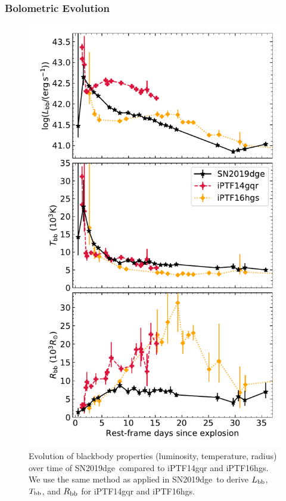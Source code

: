 \documentclass[twocolumn]{aastex63}
\newcommand{\name}{SN2019dge}
\begin{document}
\begin{CJK*}{UTF8}{gbsn}
\subsubsection{Bolometric Evolution} \label{subsubsec:bolometric_evolution}
\begin{figure}[!htbp] 
	\centering
	\includegraphics[width=\columnwidth]{figures/Tbb_Rbb_log.pdf}
	\caption{Evolution of blackbody properties (luminosity, temperature, radius) over time of 
		\name\ compared to iPTF14gqr and iPTF16hgs. We use the same method as applied in \name\ to 
		derive $L_{\rm bb}$, $T_{\rm bb}$, and $R_{\rm bb}$ for iPTF14gqr and iPTF16hgs. }

\end{figure}
\end{CJK*}
\end{document}
